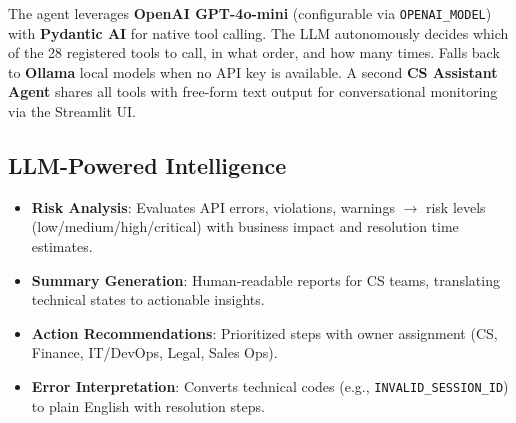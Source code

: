 \documentclass[8pt,a4paper]{article}
\begin{document}
The agent leverages \textbf{OpenAI GPT-4o-mini} (configurable via \texttt{OPENAI\_MODEL}) with \textbf{Pydantic AI} for native tool calling. The LLM autonomously decides which of the 28 registered tools to call, in what order, and how many times. Falls back to \textbf{Ollama} local models when no API key is available. A second \textbf{CS Assistant Agent} shares all tools with free-form text output for conversational monitoring via the Streamlit UI.

\vspace{0.05em}
\begin{minipage}[t]{0.56\textwidth}
\vspace{0pt}
\subsection{LLM-Powered Intelligence}
\begin{itemize}
\item \textbf{Risk Analysis}: Evaluates API errors, violations, warnings $\rightarrow$ risk levels (low/medium/high/critical) with business impact and resolution time estimates.
\item \textbf{Summary Generation}: Human-readable reports for CS teams, translating technical states to actionable insights.
\item \textbf{Action Recommendations}: Prioritized steps with owner assignment (CS, Finance, IT/DevOps, Legal, Sales Ops).
\item \textbf{Error Interpretation}: Converts technical codes (e.g., \texttt{INVALID\_SESSION\_ID}) to plain English with resolution steps.
\end{itemize}

\vspace{2pt}


\end{minipage}
\end{document}
